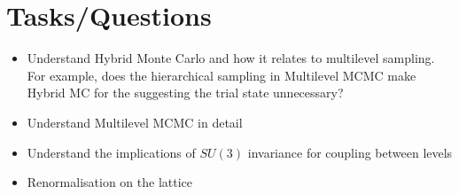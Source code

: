 \documentclass[11pt]{article}
\begin{document}
\section{Tasks/Questions}
\begin{itemize}
  \item Understand Hybrid Monte Carlo and how it relates to multilevel sampling. For example, does the hierarchical sampling in Multilevel MCMC make Hybrid MC for the suggesting the trial state unnecessary?
  \item Understand Multilevel MCMC in detail
  \item Understand the implications of $SU(3)$ invariance for coupling between levels
  \item Renormalisation on the lattice
\end{itemize}


\end{document}
